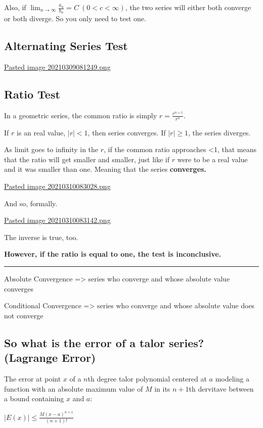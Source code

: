 \documentclass[letterpaper]{article}
\begin{document}
Also, if \(\lim_{n \to \infty} \frac{a_n}{b_n} = C\ (0<c<\infty)\), the
two series will either both converge or both diverge. So you only need
to test one.

\subsection{Alternating Series Test}
\label{sec:org0947423}
\href{Pasted image 20210309081249.png.org}{Pasted image
20210309081249.png}

\subsection{Ratio Test}
\label{sec:org51a7764}
In a geometric series, the common ratio is simply
\(r = \frac{r^{n+1}}{r^n}\).

If \(r\) is an real value, \(|r|<1\), then series converges. If
\(|r| \geq 1\), the series diverges.

As limit goes to infinity in the \(r\), if the common ratio approaches
<1, that means that the ratio will get smaller and smaller, just like if
\(r\) were to be a real value and it was smaller than one. Meaning that
the series \textbf{converges.}

\href{Pasted image 20210310083028.png.org}{Pasted image
20210310083028.png}

And so, formally.

\href{Pasted image 20210310083142.png.org}{Pasted image
20210310083142.png}

The inverse is true, too.

\textbf{However, if the ratio is equal to one, the test is inconclusive.}

\noindent\rule{\textwidth}{0.5pt}

Absolute Convergence => series who converge and whose absolute value
converges

Conditional Convergence => series who converge and whose absolute value
does not converge

\subsection{So what is the error of a talor series? (Lagrange Error)}
\label{sec:org144663a}
The error at point \(x\) of a \(n\)th degree talor polynomial centered
at \(a\) modeling a function with an absolute maximum value of \(M\) in
its \(n+1\)th dervitave between a bound containing \(x\) and \(a\):

\(|E(x)| \leq \frac{M(x-a)^{n+1}}{(n+1)!}\)
\end{document}
